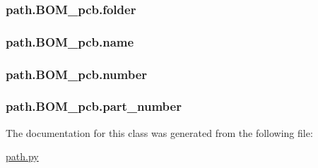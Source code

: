 \subsubsection[{folder}]{\setlength{\rightskip}{0pt plus 5cm}path.\+B\+O\+M\+\_\+pcb.\+folder}\label{classpath_1_1_b_o_m__pcb_a4dfa5a017bff453b1b6fce0849c381d9}
\hypertarget{classpath_1_1_b_o_m__pcb_a9dc2e31cb5a736091b3d89618f8050d3}{}
\subsubsection[{name}]{\setlength{\rightskip}{0pt plus 5cm}path.\+B\+O\+M\+\_\+pcb.\+name}\label{classpath_1_1_b_o_m__pcb_a9dc2e31cb5a736091b3d89618f8050d3}
\hypertarget{classpath_1_1_b_o_m__pcb_a7e12cc393a94f5172869b8b8b657deb7}{}
\subsubsection[{number}]{\setlength{\rightskip}{0pt plus 5cm}path.\+B\+O\+M\+\_\+pcb.\+number}\label{classpath_1_1_b_o_m__pcb_a7e12cc393a94f5172869b8b8b657deb7}
\hypertarget{classpath_1_1_b_o_m__pcb_a2c2a229a0f49a2c48218a775404c2ce6}{}
\subsubsection[{part\+\_\+number}]{\setlength{\rightskip}{0pt plus 5cm}path.\+B\+O\+M\+\_\+pcb.\+part\+\_\+number}\label{classpath_1_1_b_o_m__pcb_a2c2a229a0f49a2c48218a775404c2ce6}


The documentation for this class was generated from the following file\+:\begin{DoxyCompactItemize}
\item 
\hyperlink{path_8py}{path.\+py}\end{DoxyCompactItemize}
